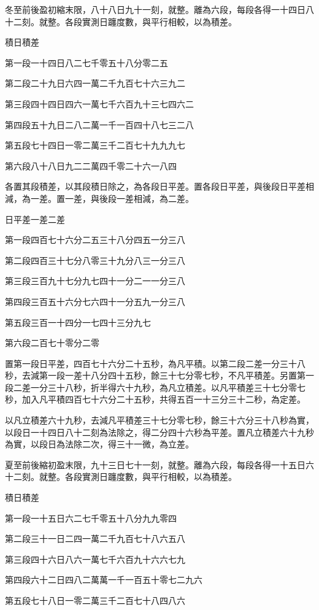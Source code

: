 冬至前後盈初縮末限，八十八日九十一刻，就整。離為六段，每段各得一十四日八十二刻。就整。各段實測日躔度數，與平行相較，以為積差。

積日積差

第一段一十四日八二七千零五十八分零二五

第二段二十九日六四一萬二千九百七十六三九二

第三段四十四日四六一萬七千六百九十三七四六二

第四段五十九日二八二萬一千一百四十八七三二八

第五段七十四日一零二萬三千二百七十九九九七

第六段八十八日九二二萬四千零二十六一八四

各置其段積差，以其段積日除之，為各段日平差。置各段日平差，與後段日平差相減，為一差。置一差，與後段一差相減，為二差。

日平差一差二差

第一段四百七十六分二五三十八分四五一分三八

第二段四百三十七分八零三十九分八三一分三八

第三段三百九十七分九七四十一分二一一分三八

第四段三百五十六分七六四十一分五九一分三八

第五段三百一十四分一七四十三分九七

第六段二百七十零分二零

置第一段日平差，四百七十六分二十五秒，為凡平積。以第二段二差一分三十八秒，去減第一段一差十八分四十五秒，餘三十七分零七秒，不凡平積差。另置第一段二差一分三十八秒，折半得六十九秒，為凡立積差。以凡平積差三十七分零七秒，加入凡平積四百七十六分二十五秒，共得五百一十三分三十二秒，為定差。

以凡立積差六十九秒，去減凡平積差三十七分零七秒，餘三十六分三十八秒為實，以段日一十四日八十二刻為法除之，得二分四十六秒為平差。置凡立積差六十九秒為實，以段日為法除二次，得三十一微，為立差。

夏至前後縮初盈末限，九十三日七十一刻，就整。離為六段，每段各得一十五日六十二刻。就整。各段實測日躔度數，與平行相較，以為積差。

積日積差

第一段一十五日六二七千零五十八分九九零四

第二段三十一日二四一萬二千九百七十八六五八

第三段四十六日八六一萬七千六百九十六六七九

第四段六十二日四八二萬萬一千一百五十零七二九六

第五段七十八日一零二萬三千二百七十八四八六


